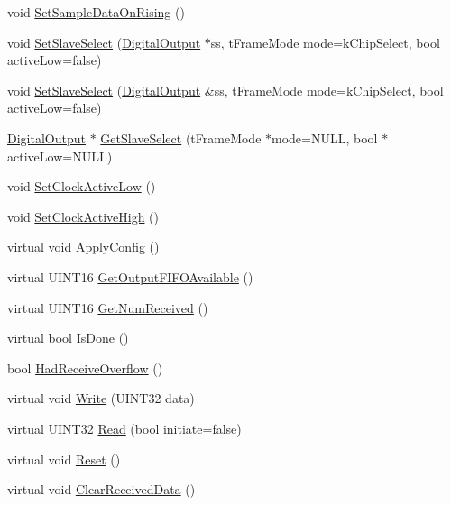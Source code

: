 \begin{DoxyCompactItemize}
void \hyperlink{classSPI_a00eec7d4310c18e8cfb4b36592b488d9}{SetSampleDataOnRising} ()
\item 
void \hyperlink{classSPI_af0a6cd80fbc758c2a8e344f044e1a59d}{SetSlaveSelect} (\hyperlink{classDigitalOutput}{DigitalOutput} $\ast$ss, tFrameMode mode=kChipSelect, bool activeLow=false)
\item 
void \hyperlink{classSPI_ad2745d268c7350f65d4657b6d558a67a}{SetSlaveSelect} (\hyperlink{classDigitalOutput}{DigitalOutput} \&ss, tFrameMode mode=kChipSelect, bool activeLow=false)
\item 
\hyperlink{classDigitalOutput}{DigitalOutput} $\ast$ \hyperlink{classSPI_a614dfabba0dcbb66d6c1a88ba40bd26c}{GetSlaveSelect} (tFrameMode $\ast$mode=NULL, bool $\ast$activeLow=NULL)
\item 
void \hyperlink{classSPI_aa1b8cb48216e0a502bb34486636da047}{SetClockActiveLow} ()
\item 
void \hyperlink{classSPI_a5581a5f70c8e49dd712d44f40ee81e6f}{SetClockActiveHigh} ()
\item 
virtual void \hyperlink{classSPI_a660a95177a0e69be2ae3b0f5ace85d2c}{ApplyConfig} ()
\item 
virtual UINT16 \hyperlink{classSPI_a9154529287b4995e403ed110e76963cd}{GetOutputFIFOAvailable} ()
\item 
virtual UINT16 \hyperlink{classSPI_ab4de7fc2759b427c33af1aa0d79b1973}{GetNumReceived} ()
\item 
virtual bool \hyperlink{classSPI_a88ae50d03a0aeecac3045a4d5ca7fb81}{IsDone} ()
\item 
bool \hyperlink{classSPI_aec0f909f191fec08bb1a069bdb35fd8e}{HadReceiveOverflow} ()
\item 
virtual void \hyperlink{classSPI_a231184061058fc3924e0d5e3abb0dcb1}{Write} (UINT32 data)
\item 
virtual UINT32 \hyperlink{classSPI_a748b582c349402ddc4ea0fb0034b00b3}{Read} (bool initiate=false)
\item 
virtual void \hyperlink{classSPI_a19bcc2d6206a4c54a62cd0a358ef1d1a}{Reset} ()
\item 
virtual void \hyperlink{classSPI_ae70ffd5d8cd8f973b9fc2103d2ee3474}{ClearReceivedData} ()
\end{DoxyCompactItemize}
